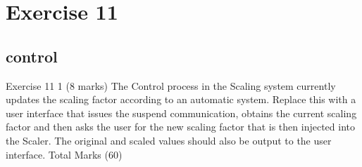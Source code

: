 \documentclass[10pt, a4paper]{article}
\begin{document}
   	\setcounter{section}{11}
   \section*{Exercise 11}
   
   \setcounter{subsection}{0}
   

   \subsection{control}
   Exercise 11 1   (8 marks)
   The Control process in the Scaling system currently updates the scaling factor according to an automatic system.  Replace this with a user interface that issues the suspend communication, obtains the current scaling factor and then asks the user for the new scaling factor that is then injected into the Scaler.  The original and scaled values should also be output to the user interface.
   Total Marks  (60)
   
	
\end{document}
